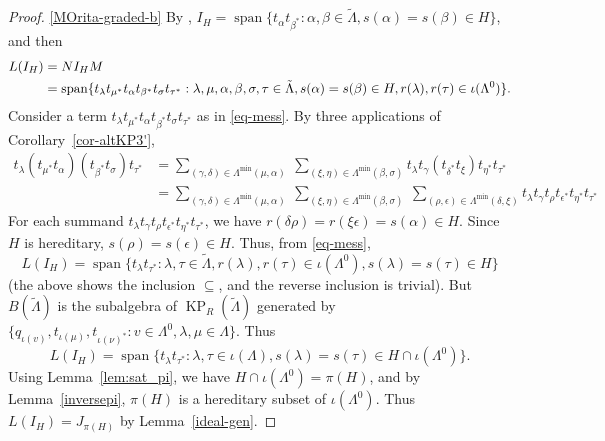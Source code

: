 \documentclass[a4paper,12pt]{amsart}
\numberwithin{equation}{section}
\theoremstyle{definition}
\theoremstyle{remark}
\begin{document}
\begin{proof}
\eqref{MOrita-graded-b}  By \cite[Lemma~5.4]{ACaHR}, 
$
I_H={\operatorname{\mathrm{span}}}\{t_\alpha t_{\beta^{*}}: \alpha,\beta\in{\tilde{\Lambda}}, s(\alpha)=s(\beta)\in H\}
$, and then
\begin{align}
L(I_H)&=NI_HM\notag\\
&={\operatorname{\mathrm{span}}}\{t_\lambda t_{\mu^*}t_\alpha t_{\beta^{*}}t_\sigma t_{\tau^{*}}: \lambda, \mu, \alpha,\beta, \sigma,\tau\in{\tilde{\Lambda}},s(\alpha)=s(\beta)\in H, r(\lambda),r(\tau)\in\iota(\Lambda^0)\}.\label{eq-mess}
\end{align}
Consider a term $t_\lambda t_{\mu^*}t_\alpha t_{\beta^{*}}t_\sigma t_{\tau^{*}}$ as in \eqref{eq-mess}.  By three applications of Corollary~\ref{cor-altKP3'},
\begin{align*}
t_\lambda (t_{\mu^*}t_\alpha)( t_{\beta^{*}}t_\sigma) t_{\tau^{*}}&=\sum_{(\gamma,\delta)\in\Lambda^{\min}(\mu,\alpha)}
\ \sum_{(\xi,\eta)\in\Lambda^{\min}(\beta,\sigma)} t_\lambda t_\gamma (t_{\delta^*}t_\xi) t_{\eta^*}t_{\tau^{*}}\\
&=\sum_{(\gamma,\delta)\in\Lambda^{\min}(\mu,\alpha)}
\ \sum_{(\xi,\eta)\in\Lambda^{\min}(\beta,\sigma)} \ \sum_{(\rho,\epsilon)\in\Lambda^{\min}(\delta,\xi)}t_\lambda t_\gamma t_{\rho}t_{\epsilon^*} t_{\eta^*}t_{\tau^{*}}
\end{align*}
For each summand   $t_\lambda t_\gamma t_{\rho}t_{\epsilon^*} t_{\eta^*}t_{\tau^{*}}$, we have $r(\delta\rho)=r(\xi\epsilon)=s(\alpha)\in H$. Since $H$ is hereditary, $s(\rho)=s(\epsilon)\in H$. Thus, from \eqref{eq-mess}, 
\[
L(I_H)={\operatorname{\mathrm{span}}}\{t_\lambda t_{\tau^*}:\lambda,\tau\in{\tilde{\Lambda}}, r(\lambda),r(\tau)\in\iota(\Lambda^0), s(\lambda)=s(\tau)\in H\}
\]
(the above shows the inclusion $\subseteq$, and the reverse inclusion is trivial).  But $B(\tilde\Lambda)$ 
is the subalgebra  of $\operatorname{KP}_R(\tilde{\Lambda})$ generated by $\{q_{\iota(v)}, t_{\iota(\mu)}, t_{\iota(\nu)^*}:v\in\Lambda^0, \lambda,\mu\in\Lambda\}$. Thus 
\[
L(I_H)={\operatorname{\mathrm{span}}}\{t_\lambda t_{\tau^*}:\lambda,\tau\in\iota(\Lambda), s(\lambda)=s(\tau)\in H\cap \iota(\Lambda^0)\}.
\]
Using Lemma~\ref{lem:sat_pi}, we have $H\cap \iota(\Lambda^0)=\pi(H)$, and by Lemma~\ref{inversepi}, $\pi(H)$ is a hereditary subset of $\iota(\Lambda^0)$.  Thus $L(I_H)=J_{\pi(H)}$ by Lemma~\ref{ideal-gen}.
\end{proof}
\end{document}
